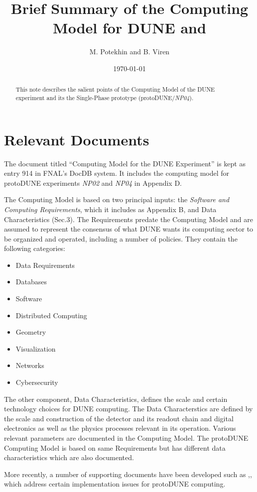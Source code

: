 \documentclass[pdftex,12pt,letter]{article}
\title{Brief Summary of the Computing Model for DUNE and \pd}
\date{\today}
\author{M. Potekhin and B. Viren}
\newcommand{\pd}{protoDUNE\xspace}
\newcommand{\expname}{\textit{NP04}\xspace}
\newcommand{\eXpname}{\textit{NP02}\xspace}
\begin{document}
\maketitle

\begin{abstract}
\noindent  This note describes  the salient points of the Computing Model of the DUNE experiment and its the Single-Phase prototype (\pd/\expname).
\end{abstract}

\section{Relevant Documents}

The document titled ``Computing Model for the DUNE Experiment'' is kept as entry 914 in FNAL's DocDB system.
It includes the computing model for \pd experiments \eXpname and \expname in Appendix D.

The Computing Model is based on two principal inputs: the \textit{Software and Computing Requirements},
which it includes as Appendix B, and Data Characteristics (Sec.3). The Requirements predate the Computing Model and
are assumed to represent the consensus of what DUNE wants its computing sector to be organized and operated, including
a number of policies. They contain the following categories:
\begin{itemize}
\item Data Requirements
\item Databases
\item Software
\item Distributed Computing
\item Geometry
\item Visualization
\item Networks
\item Cybersecurity
\end{itemize}

\noindent The other component, Data Characteristics, defines the scale and certain technology choices for DUNE computing.
The Data Characterstics are defined by the scale and construction of the detector and its readout chain and digital electronics
as well as the physics processes relevant in its operation. Various relevant parameters are documented in the Computing Model.
The \pd Computing Model is based on same Requirements but has different data characteristics which are also documented.

More recently, a number of supporting documents have been developed such as \cite{docdb1086},\cite{docdb1212},\cite{docdb1811}
which address certain implementation issues for \pd computing.
\end{document}
